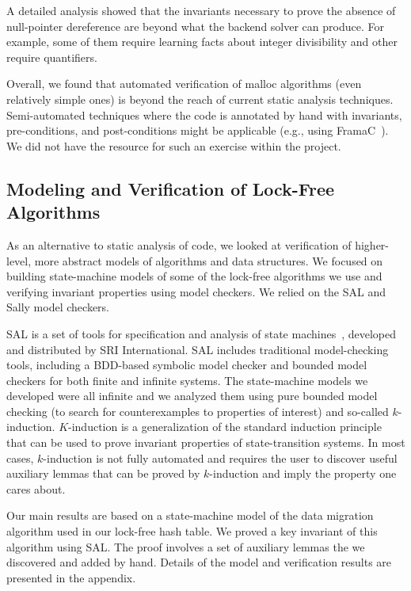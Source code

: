 \documentclass[twoside,12pt]{cslreport}
\begin{document}
A detailed analysis showed that the invariants necessary to prove the
absence of null-pointer dereference are beyond what the backend solver
can produce. For example, some of them require learning facts about
integer divisibility and other require quantifiers.

Overall, we found that automated verification of malloc algorithms
(even relatively simple ones) is beyond the reach of current static
analysis techniques. Semi-automated techniques where the code is
annotated by hand with invariants, pre-conditions, and post-conditions
might be applicable (e.g., using
FramaC~\cite{Kirchner+etal:FramaC:2015}). We did not have the resource
for such an exercise within the project.


\subsection{Modeling and Verification of Lock-Free Algorithms}

As an alternative to static analysis of code, we looked at
verification of higher-level, more abstract models of algorithms and
data structures. We focused on building state-machine models of some
of the lock-free algorithms we use and verifying invariant properties
using model checkers. We relied on the SAL and Sally model checkers.

SAL is a set of tools for specification and analysis of state
machines~\cite{deMoura+etal:SAL:2004}, developed and distributed by
SRI International. SAL includes traditional model-checking tools,
including a BDD-based symbolic model checker and bounded model
checkers for both finite and infinite systems. The state-machine
models we developed were all infinite and we analyzed them using pure
bounded model checking (to search for counterexamples to properties of
interest) and so-called $k$-induction. $K$-induction is a
generalization of the standard induction principle that can be used to
prove invariant properties of state-transition systems.  In most
cases, $k$-induction is not fully automated and requires the user to
discover useful auxiliary lemmas that can be proved by $k$-induction
and imply the property one cares about.

Our main results are based on a state-machine model of the data
migration algorithm used in our lock-free hash table. We proved a key
invariant of this algorithm using SAL. The proof involves a set of
auxiliary lemmas the we discovered and added by hand. Details of the
model and verification results are presented in the appendix.
\end{document}
